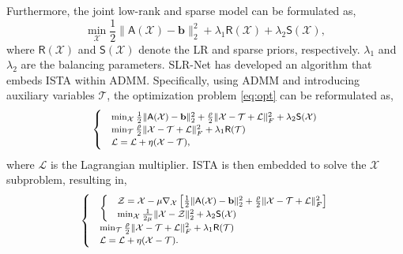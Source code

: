 Furthermore, the joint low-rank and sparse model can be formulated as,
\begin{equation}
    \label{eq:opt}
    \min_{\mathcal{X}} \frac12 \| \mathsf{A}(\mathcal{X}) - \mathbf{b} \|_2^2 + \lambda_1 \mathsf{R}(\mathcal{X}) + \lambda_2 \mathsf{S}(\mathcal{X}),
\end{equation}
where $\mathsf{R}(\mathcal{X})$ and $\mathsf{S}(\mathcal{X})$ denote the LR and sparse priors, respectively. $\lambda_1$ and $\lambda_2$ are the balancing parameters.
SLR-Net has developed an algorithm that embeds ISTA within ADMM. Specifically, using ADMM and introducing auxiliary variables $\mathcal{T}$, the optimization problem \eqref{eq:opt} can be reformulated as,
\begin{equation}
    \footnotesize
    \label{eq:opt_admm}
    \begin{cases}
        &\min_{\mathcal{X}} \frac12 \| \mathsf{A}(\mathcal{X}) - \mathbf{b} \|_2^2  + \frac\rho2 \|\mathcal{X} - \mathcal{T}+\mathcal{L}\|_F^2  + \lambda_2 \mathsf{S}(\mathcal{X})\\
        &\min_{\mathcal{T}} \frac\rho2 \|\mathcal{X} - \mathcal{T}+\mathcal{L}\|_F^2 + \lambda_1 \mathsf{R}(\mathcal{T})\\
        &\mathcal{L} = \mathcal{L} + \eta(\mathcal{X} - \mathcal{T}),
    \end{cases}
\end{equation}
where $\mathcal{L}$ is the Lagrangian multiplier. ISTA is then embedded to solve the $\mathcal{X}$ subproblem, resulting in, 
\begin{equation}
    \footnotesize
    \label{eq:opt_pgdadmm}
    \begin{cases}
        & \begin{cases}
            & \mathcal{Z} = \mathcal{X} - \mu \nabla_\mathcal{X}\left[\frac12 \| \mathsf{A}(\mathcal{X}) - \mathbf{b} \|_2^2  + \frac\rho2 \|\mathcal{X} - \mathcal{T}+\mathcal{L}\|_F^2\right] \\
            & \min_{\mathcal{X}} \frac1{2\mu} \|  \mathcal{X} - \mathcal{Z} \|_2^2 + \lambda_2 \mathsf{S}(\mathcal{X})
            \end{cases} \\
        &\min_{\mathcal{T}} \frac\rho2 \|\mathcal{X} - \mathcal{T}+\mathcal{L}\|_F^2 + \lambda_1 \mathsf{R}(\mathcal{T})\\
        &\mathcal{L} = \mathcal{L} + \eta(\mathcal{X} - \mathcal{T}).
    \end{cases}
\end{equation}
